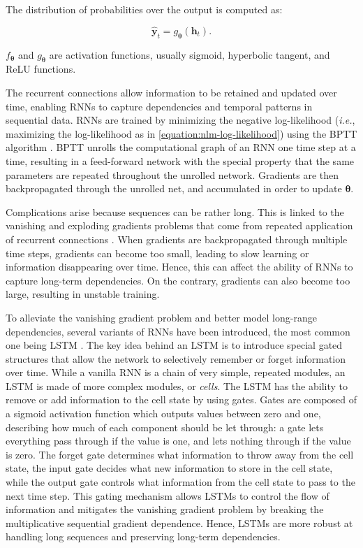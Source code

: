 The distribution of probabilities over the output is computed as:

\begin{equation}
    \hat{\bm{y}}_t = g_{\bm{\theta}}(\bm{h}_t).
\end{equation}

\noindent $f_{\bm{\theta}}$ and $g_{\bm{\theta}}$ are activation functions, usually sigmoid, hyperbolic tangent, and \ac{ReLU} functions.

The recurrent connections allow information to be retained and updated over time, enabling \acp{RNN} to capture dependencies and temporal patterns in sequential data. \acp{RNN} are trained by minimizing the negative log-likelihood (\textit{i.e.}, maximizing the log-likelihood as in \ref{equation:nlm-log-likelihood}) using the \ac{BPTT} algorithm \citep{werbos1990backpropagation}. \ac{BPTT} unrolls the computational graph of an \ac{RNN} one time step at a time, resulting in a feed-forward network with the special property that the same parameters are repeated throughout the unrolled network. Gradients are then backpropagated through the unrolled net, and accumulated in order to update $\bm{\theta}$. 

Complications arise because sequences can be rather long. This is linked to the vanishing and exploding gradients problems that come from repeated application of recurrent connections \citep{hochreiter2001gradient}. When gradients are backpropagated through multiple time steps, gradients can become too small, leading to slow learning or information disappearing over time. Hence, this can affect the ability of \acp{RNN} to capture long-term dependencies. On the contrary, gradients can also become too large, resulting in unstable training. 

To alleviate the vanishing gradient problem and better model long-range dependencies, several variants of \acp{RNN} have been introduced, the most common one being \ac{LSTM} \citep{hochreiter1997long}. The key idea behind an \ac{LSTM} is to introduce special gated structures that allow the network to selectively remember or forget information over time. While a vanilla \ac{RNN} is a chain of very simple, repeated modules, an \ac{LSTM} is made of more complex modules, or \textit{cells}. The LSTM has the ability to remove or add information to the cell state by using gates. Gates are composed of a sigmoid activation function which outputs values between zero and one, describing how much of each component should be let through: a gate lets everything pass through if the value is one, and lets nothing through if the value is zero. The forget gate determines what information to throw away from the cell state, the input gate decides what new information to store in the cell state, while the output gate controls what information from the cell state to pass to the next time step. This gating mechanism allows \acp{LSTM} to control the flow of information and mitigates the vanishing gradient problem by breaking the multiplicative sequential gradient dependence. Hence, \acp{LSTM} are more robust at handling long sequences and preserving long-term dependencies.


